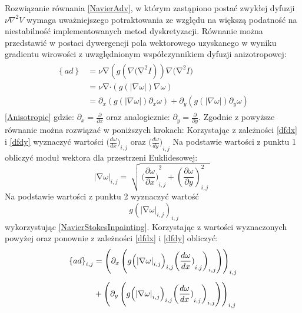 \documentclass[12pt, twoside, openany]{report}
\theoremstyle{definition}
\begin{document}
\par
Rozwiązanie równania \eqref{NavierAdv}, w którym zastąpiono postać zwykłej dyfuzji $\nu {\nabla }^2V$ wymaga uważniejszego potraktowania ze względu na większą podatność na niestabilność implementowanych metod dyskretyzacji. Równanie można przedstawić w postaci dywergencji pola wektorowego uzyskanego w wyniku gradientu wirowości z uwzględnionym współczynnikiem dyfuzji anizotropowej:
\begin{align}
\begin{aligned}
\left\{ad\right\} 
&= \nu \mathrm{\nabla }(g(\nabla {\mathrm{(}\mathrm{\nabla }}^2I))\nabla {\mathrm{(}\mathrm{\nabla }}^2I) \\[1ex]
&= \nu \mathrm{\nabla }\mathrm{\cdot}(g(|\nabla \omega |)\nabla \omega )   \\[1ex]
&= {\partial }_x\left(g\left(\left|\nabla \omega \right|\right){\partial }_x\omega \right)+{\partial }_y\left(g\left(\left|\nabla \omega \right|\right){\partial }_y\omega \right)
\end{aligned}
\label{Anisotropic}
\end{align}
\eqref{Anisotropic}
gdzie: ${\partial }_x=\frac{\partial }{\partial x}$ oraz analogicznie: ${\partial }_y=\frac{\partial }{\partial y}$.
Zgodnie z \cite{ebrahimi2012navier} powyższe równanie można rozwiązać w poniższych krokach:
Korzystając z zależności \eqref{dfdx} i \eqref{dfdy} wyznaczyć wartości $({\frac{d\omega }{dx})}_{i,j}$ oraz $({\frac{d\omega }{dy})}_{i,j}$
Na podstawie wartości z punktu 1 obliczyć moduł wektora dla przestrzeni Euklidesowej:
\begin{equation}
{\left|\mathrm{\nabla }\omega \right|}_{i,j}=\ \sqrt{\mathrm{\ }({\frac{\partial \omega }{\partial x})}^2_{i,j}+{\left(\frac{\partial \omega }{\partial y}\right)}^2_{i,j}\ }\
\label{magnitudedw}
\end{equation}
Na podstawie wartości z punktu 2 wyznaczyć wartość $$\ g{\left({\left|\mathrm{\nabla }\omega \right|}_{i,j}\right)}_{i,j}$$ wykorzystując \eqref{NavierStokesInpainting}. Korzystając z wartości wyznaczonych powyżej oraz ponownie z zależności \eqref{dfdx} i \eqref{dfdy} obliczyć:
\begin{align}
{\left\{ad\right\}}_{i,j} &= {\left({\partial }_x\left(g{\left({\left|\mathrm{\nabla }\omega \right|}_{i,j}\right)}_{i,j}{\left({\frac{d\omega }{dx})}_{i,j}\right)}_{i,j}\right)\right)}_{i,j} \notag \\[1ex]
&+ {\left({\partial }_y\left(g{\left({\left|\mathrm{\nabla }\omega \right|}_{i,j}\right)}_{i,j}{\left({\frac{d\omega }{dx})}_{i,j}\right)}_{i,j}\right)\right)}_{i,j}
\label{discreteAnisotropic}
\end{align}
\end{document}
